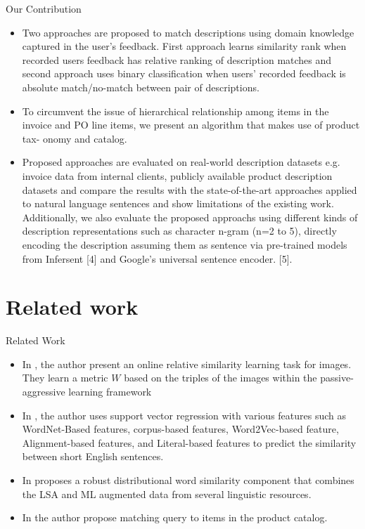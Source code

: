 \documentclass[blue]{beamer}
\begin{document}
\begin{frame}{Our Contribution}
\begin{itemize}
 \itemsep0em
\item  Two approaches are proposed to match descriptions
using domain knowledge captured in the user’s
feedback. First approach learns similarity rank when
recorded users feedback has relative ranking of description matches and second approach uses binary
classification when users’ recorded feedback is absolute match/no-match between pair of descriptions.
\item To circumvent the issue of hierarchical relationship
among items in the invoice and PO line items, we
present an algorithm that makes use of product tax-
onomy and catalog.
\item Proposed approaches are evaluated on real-world
description datasets e.g. invoice data from internal clients, publicly available product description datasets and compare the results with the state-of-the-art approaches applied to natural language sentences and show limitations of the existing work. Additionally, we also evaluate the proposed approachs using different kinds of description representations such as character n-gram (n=2 to 5), directly encoding the description assuming them as sentence via
pre-trained models from Infersent [4] and Google’s
universal sentence encoder. [5].
\end{itemize}

\end{frame}

\section{Related work}

\begin{frame}{Related Work}

\begin{itemize}
\item In \cite{chechik2010large}, the author present an online relative similarity learning task for images. They learn a metric $W$ based on the triples of the images within the passive-aggressive learning framework \cite{crammer2006online}

\item In \cite{liu2015computing}, the author uses support vector regression with various features such as WordNet-Based features, corpus-based features, Word2Vec-based feature, Alignment-based features, and Literal-based features to predict the similarity between short English sentences.

\item In \cite{kashyap2016robust} proposes a robust distributional word similarity component that combines the LSA and ML augmented data from several linguistic resources.

\item In \cite{kutiyanawala2018towards,hu2018reinforcement} the author propose matching query to items in the product catalog.

\end{itemize}
\end{frame}
\end{document}
